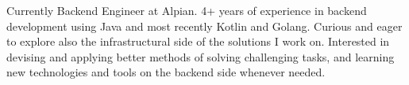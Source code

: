

\begin{cvparagraph}
	
	Currently Backend Engineer at Alpian. 4+ years of experience in backend development using Java and most recently Kotlin and Golang. Curious and eager to explore also the infrastructural side of the solutions I work on. Interested in devising and applying better methods of solving challenging tasks, and learning new technologies and tools on the backend side whenever needed.
\end{cvparagraph}